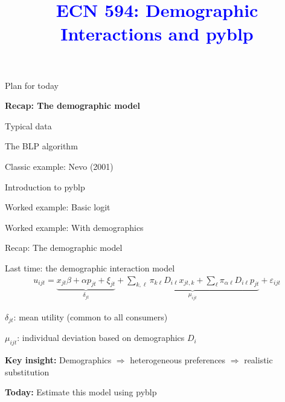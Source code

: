 \documentclass[notes,11pt, aspectratio=169]{beamer}
\title[]{\textcolor{blue}{ECN 594: Demographic Interactions and pyblp}}
\author[PGP]{}
\institute[FRBNY]{\small{\begin{tabular}{c c c}
Nicholas Vreugdenhil \\
\end{tabular}}}
\date{}
\newenvironment{wideitemize}{\itemize\addtolength{\itemsep}{10pt}}{\enditemize}
\newenvironment{wideenumerate}{\enumerate\addtolength{\itemsep}{10pt}}{\endenumerate}
\begin{document}
\begin{frame}
\maketitle
  \centering
\end{frame}

\begin{frame}{Plan for today}
  \begin{wideenumerate}
    \item \textbf{Recap: The demographic model}
    \item Typical data
    \item The BLP algorithm
    \item Classic example: Nevo (2001)
    \item Introduction to pyblp
    \item Worked example: Basic logit
    \item Worked example: With demographics
  \end{wideenumerate}
\end{frame}


\begin{frame}{Recap: The demographic model}
	\begin{wideitemize}
		\item Last time: the demographic interaction model
		\begin{align*}
			u_{ijt} = \underbrace{x_{jt} \beta + \alpha p_{jt} + \xi_{jt}}_{\delta_{jt}} + \underbrace{\sum_{k,\ell} \pi_{k\ell} D_{i\ell} x_{jt,k} + \sum_{\ell} \pi_{\alpha\ell} D_{i\ell} p_{jt}}_{\mu_{ijt}} + \varepsilon_{ijt}
		\end{align*}
		\item $\delta_{jt}$: mean utility (common to all consumers)
		\item $\mu_{ijt}$: individual deviation based on demographics $D_i$
		\item \textbf{Key insight:} Demographics $\Rightarrow$ heterogeneous preferences $\Rightarrow$ realistic substitution
		\item \textbf{Today:} Estimate this model using pyblp
	\end{wideitemize}
\end{frame}

\end{document}
